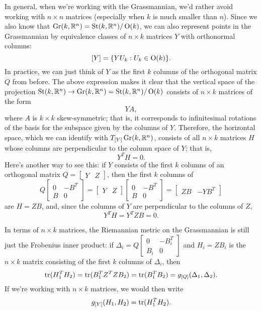 In general, when we're working with the Grassmannian, we'd rather avoid working with $n \times n$ matrices (especially when $k$ is much smaller than $n$). Since we also know that $\operatorname{Gr}(k,\mathbb{R}^n) = \operatorname{St}(k,\mathbb{R}^n)/\operatorname{O}(k)$, we can also represent points in the Grassmannian by equivalence classes of $n \times k$ matrices $Y$ with orthonormal columns:
\[
	[Y] = \{Y U_k : U_k \in \operatorname{O}(k)\}.
\]
In practice, we can just think of $Y$ as the first $k$ columns of the orthogonal matrix $Q$ from before. The above expression makes it clear that the vertical space of the projection $\operatorname{St}(k,\mathbb{R}^n) \to \operatorname{Gr}(k,\mathbb{R}^n) = \operatorname{St}(k,\mathbb{R}^n)/\operatorname{O}(k)$ consists of $n \times k$ matrices of the form
\[
	Y A,
\]
where $A$ is $k \times k$ skew-symmetric; that is, it corresponds to infinitesimal rotations of the basis for the subspace given by the columns of $Y$. Therefore, the horizontal space, which we can identify with $T_{[Y]} \operatorname{Gr}(k,\mathbb{R}^n)$, consists of all $n \times k$ matrices $H$ whose columns are perpendicular to the column space of $Y$; that is,
\[
	Y^T H = 0.
\]
Here's another way to see this: if $Y$ consists of the first $k$ columns of an orthogonal matrix $Q = \begin{bmatrix} Y & Z \end{bmatrix}$, then the first $k$ columns of 
\[
	Q \begin{bmatrix} 0 & -B^T \\ B & 0 \end{bmatrix} = \begin{bmatrix} Y & Z \end{bmatrix} \begin{bmatrix} 0 & -B^T \\ B & 0 \end{bmatrix} = \begin{bmatrix} ZB & -YB^T \end{bmatrix}
\]
are $H = ZB$, and, since the columns of $Y$ are perpendicular to the columns of $Z$,
\[
	Y^T H = Y^T ZB = 0.
\]

In terms of $n \times k$ matrices, the Riemannian metric on the Grassmannian is still just the Frobenius inner product: if $\Delta_i = Q\begin{bmatrix} 0 & -B_i^T \\ B_i & 0 \end{bmatrix}$ and $H_i = ZB_i$ is the $n \times k$ matrix consisting of the first $k$ columns of $\Delta_i$, then
\[
	\operatorname{tr}(H_1^T H_2) = \operatorname{tr}(B_1^TZ^T Z B_2) = \operatorname{tr}(B_1^TB_2) = g_{[Q]}(\Delta_1,\Delta_2).
\]
If we're working with $n \times k$ matrices, we would then write
\[
	g_{[Y]}(H_1, H_2) = \operatorname{tr}(H_1^TH_2).
\]

